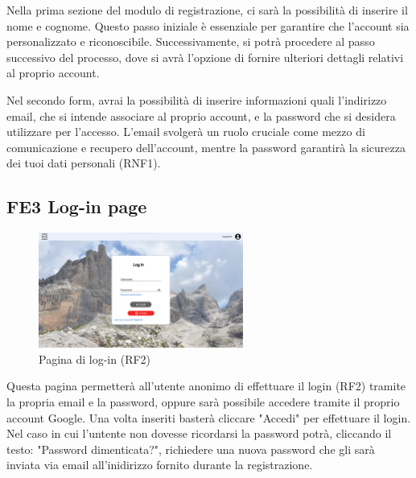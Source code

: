 \documentclass[a4paper,12pt]{article}
\begin{document}
Nella prima sezione del modulo di registrazione, ci sarà la possibilità di inserire il nome e cognome. Questo passo iniziale è essenziale per garantire che l'account sia personalizzato e riconoscibile. Successivamente, si potrà procedere al passo successivo del processo, dove si avrà l'opzione di fornire ulteriori dettagli relativi al proprio account.

Nel secondo form, avrai la possibilità di inserire informazioni quali l'indirizzo email, che si intende associare al proprio account, e la password che si desidera utilizzare per l'accesso. L'email svolgerà un ruolo cruciale come mezzo di comunicazione e recupero dell'account, mentre la password garantirà la sicurezza dei tuoi dati personali (RNF1).





\subsection*{FE3 Log-in page}
\begin{figure}[H]
   \centering
    \includegraphics[width=0.6\textwidth]{img/Log-in.png}
    \caption{Pagina di log-in (RF2)}
\end{figure}
Questa pagina permetterà all'utente anonimo di effettuare il login (RF2) tramite la propria email e la password, oppure sarà possibile accedere tramite il proprio account Google. Una volta inseriti basterà cliccare "Accedi" per effettuare il login. Nel caso in cui l'untente non dovesse ricordarsi la password potrà, cliccando il testo: "Password dimenticata?", richiedere una nuova password che gli sarà inviata via email all'inidirizzo fornito durante la registrazione.
\end{document}
